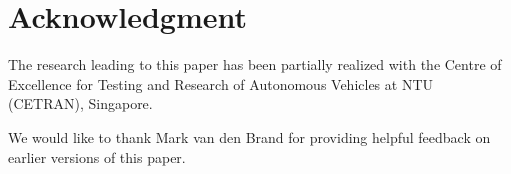 \section*{Acknowledgment}

The research leading to this paper has been partially realized with the Centre of Excellence for Testing and Research of Autonomous Vehicles at NTU (CETRAN), Singapore. 

We would like to thank Mark van den Brand for providing helpful feedback on earlier versions of this paper.
